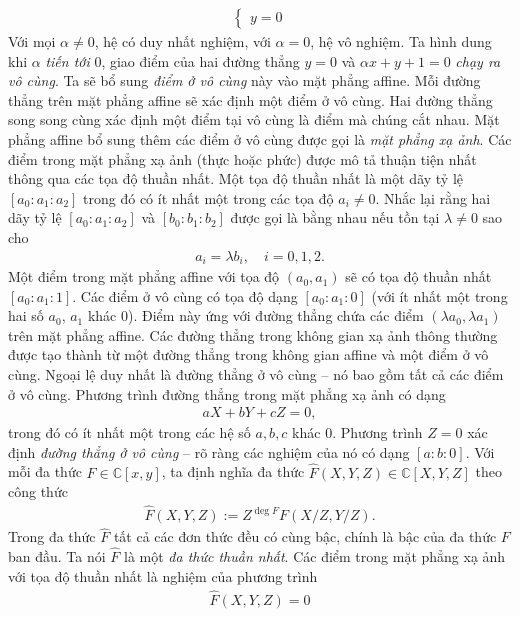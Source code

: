 \begin{multicols}{2}
\begin{align*}
\begin{cases}
			y=0
		\end{cases}
	\end{align*}
	Với mọi $\alpha\neq 0$, hệ có duy nhất nghiệm, với $\alpha=0$, hệ vô nghiệm. 
	\vskip 0.1cm
	Ta hình dung khi $\alpha$ {\em tiến tới} $0$, giao điểm của hai đường thẳng $y=0$ và $\alpha x+y+1=0$ {\em chạy ra vô cùng}. Ta sẽ bổ sung {\em điểm ở vô cùng} này vào mặt phẳng affine. Mỗi đường thẳng trên mặt phẳng affine sẽ xác định một điểm ở vô cùng. Hai đường thẳng song song cùng xác định một điểm tại vô cùng là điểm mà chúng cắt nhau. 
	\vskip 0.1cm
	Mặt phẳng affine bổ sung thêm các điểm ở vô cùng được gọi là {\em mặt phẳng xạ ảnh}. Các điểm trong mặt phẳng xạ ảnh (thực hoặc phức) được mô tả thuận tiện nhất thông qua các tọa độ thuần nhất. Một tọa độ thuần nhất là một dãy tỷ lệ $[a_0:a_1:a_2]$ trong đó có ít nhất một trong các tọa độ $a_i\neq 0$. Nhắc lại rằng hai dãy tỷ lệ $[a_0:a_1:a_2]$ và $[b_0:b_1:b_2]$ được gọi là bằng nhau nếu tồn tại $\lambda\neq 0$ sao cho
	\begin{align*}
		a_i=\lambda b_i, \quad i=0,1,2.
	\end{align*}
	Một điểm trong mặt phẳng affine với tọa độ $(a_0,a_1)$ sẽ có tọa độ thuần nhất $[a_0:a_1:1]$. Các điểm ở vô cùng có tọa độ dạng $[a_0:a_1:0]$ (với ít nhất một trong hai số $a_0$, $a_1$ khác $0$). Điểm này ứng với đường thẳng chứa các điểm $(\lambda a_0,\lambda a_1)$ trên mặt phẳng affine. 
	\vskip 0.1cm	
	Các đường thẳng trong không gian xạ ảnh thông thường được tạo thành từ một đường thẳng trong không gian affine và một điểm ở vô cùng. Ngoại lệ duy nhất là đường thẳng ở vô cùng -- nó bao gồm tất cả các điểm ở vô cùng.
	Phương trình đường thẳng trong mặt phẳng xạ ảnh có dạng
	\begin{align*}
		aX+bY+cZ=0,
	\end{align*}
	trong đó có ít nhất một trong các hệ số $a,b,c$ khác $0$. Phương trình
	$Z=0$ 
	xác định {\em đường thẳng ở vô cùng} -- rõ ràng các nghiệm của nó có dạng $[a:b:0]$.
	\vskip 0.1cm
	Với mỗi đa thức $F\in \mathbb C[x,y]$, ta định nghĩa đa thức $\widehat F(X,Y,Z)\in \mathbb C[X,Y,Z]$ theo công thức
	\begin{align*}
		\widehat F(X,Y,Z):=Z^{\deg F}F(X/Z,Y/Z).
	\end{align*}
	Trong đa thức $\widehat F$ tất cả các đơn thức đều có cùng bậc, chính là bậc của đa thức $ F$ ban đầu. Ta nói $\widehat F$ là một {\em đa thức thuần nhất}. 
	Các điểm trong mặt phẳng xạ ảnh với tọa độ thuần nhất là nghiệm của phương trình
	\begin{align*}
		\widehat F(X,Y,Z)=0

\end{align*}
\end{multicols}
